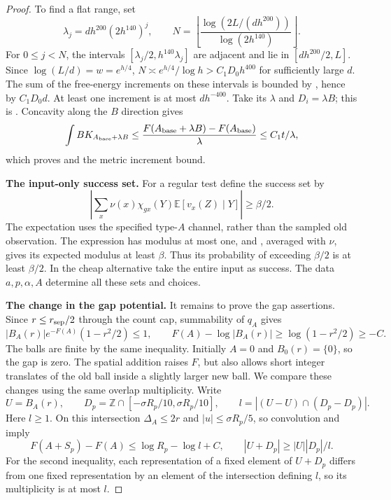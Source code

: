 \begin{proof}
To find a flat range, set
\[
 \lambda_j=dh^{200}(2h^{140})^j,
 \qquad
 N=\left\lfloor
 \frac{\log(2L/(dh^{200}))}{\log(2h^{140})}\right\rfloor.
\]
For $0\le j<N$, the intervals
$[\lambda_j/2,h^{140}\lambda_j]$ are adjacent and lie in
$[dh^{200}/2,L]$.  Since $\log(L/d)=w=e^{h/4}$,
$N\asymp e^{h/4}/\log h>C_1D_0h^{400}$ for sufficiently large $d$.
The sum of the free-energy increments on these intervals is bounded
by , hence by $C_1D_0d$.  At least one
increment is at most $dh^{-400}$.  Take its $\lambda$ and
$D_i=\lambda B$; this is .  Concavity along the
$B$ direction gives
\[
 \int BK_{A_{\rm base}+\lambda B}
 \le\frac{F(A_{\rm base}+\lambda B)-F(A_{\rm base})}{\lambda}
 \le C_1t/\lambda,
\]
which proves  and the metric increment bound.

\textbf{The input-only success set.}
For a regular test define the success set by
\begin{equation}\label{eq:thermal-success-set}
 \left|\sum_x\nu(x)\chi_{gx}(Y)
                  \mathbb E[v_x(Z)\mid Y]\right|\ge\beta/2.
\end{equation}
The expectation uses the specified type-$A$ channel, rather than the
sampled old observation.  The expression has modulus at most one, and
, averaged with $\nu$, gives its expected modulus at
least $\beta$.  Thus its probability of exceeding $\beta/2$ is at
least $\beta/2$.  In the cheap alternative take the entire input as
success.  The data $a,p,\alpha,A$ determine all these sets and choices.

\textbf{The change in the gap potential.}
It remains to prove the gap assertions. Since $r\le r_{\rm sep}/2$
through the count cap, summability of $q_A$ gives
\[
 |B_A(r)|e^{-F(A)}(1-r^2/2)\le1,
 \qquad F(A)-\log|B_A(r)|\ge\log(1-r^2/2)\ge-C.
\]
The balls are finite by the same inequality.  Initially $A=0$ and
$B_0(r)=\{0\}$, so the gap is zero.
The spatial addition raises $F$, but also allows short integer translates
of the old ball inside a slightly larger new ball. We compare these changes
using the same overlap multiplicity. Write
\[
 U=B_A(r),\qquad
 D_p=\mathbb Z\cap[-\sigma R_p/10,\sigma R_p/10],\qquad
 l=|(U-U)\cap(D_p-D_p)|.
\]
Here $l\ge1$.  On this intersection $\Delta_A\le2r$ and
$|u|\le\sigma R_p/5$, so convolution and
 imply
\begin{equation}\label{eq:thermal-packing-pair}
 F(A+S_p)-F(A)\le\log R_p-\log l+C,
 \qquad |U+D_p|\ge |U||D_p|/l.
\end{equation}
For the second inequality, each representation of a fixed element of
$U+D_p$ differs from one fixed representation by an element of the
intersection defining $l$, so its multiplicity is at most $l$.


\end{proof}
